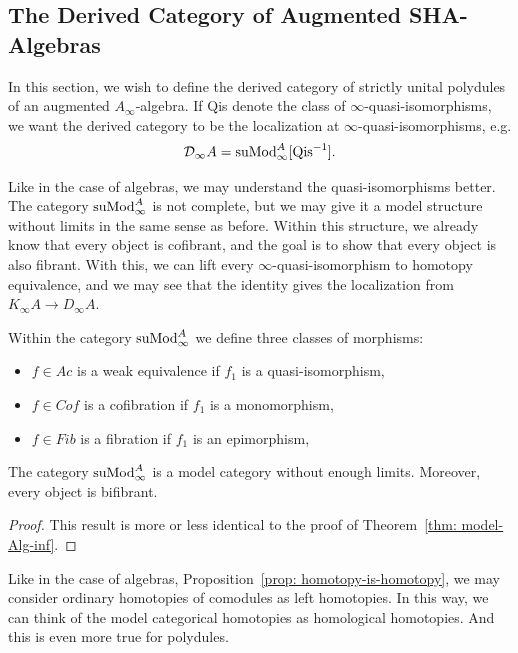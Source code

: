 \documentclass[../thesis.tex]{subfiles}
\begin{document}
        \subsection{The Derived Category of Augmented SHA-Algebras} 

            In this section, we wish to define the derived category of strictly unital polydules of an augmented $A_\infty$-algebra. If Qis denote the class of $\infty$-quasi-isomorphisms, we want the derived category to be the localization at $\infty$-quasi-isomorphisms, e.g.
            \begin{align*}
                \mathcal{D}_\infty A = \tt{suMod}_\infty^A[\tt{Qis}^{-1}].
            \end{align*}

            Like in the case of algebras, we may understand the quasi-isomorphisms better. The category $\tt{suMod}_\infty^A$ is not complete, but we may give it a model structure without limits in the same sense as before. Within this structure, we already know that every object is cofibrant, and the goal is to show that every object is also fibrant. With this, we can lift every $\infty$-quasi-isomorphism to homotopy equivalence, and we may see that the identity gives the localization from $K_\infty A \to D_\infty A$.

            Within the category $\tt{suMod}_\infty^A$ we define three classes of morphisms:
            \begin{itemize}
                \item $f\in Ac$ is a weak equivalence if $f_1$ is a quasi-isomorphism,
                \item $f\in Cof$ is a cofibration if $f_1$ is a monomorphism,
                \item $f\in Fib$ is a fibration if $f_1$ is an epimorphism,
            \end{itemize}

            \begin{thm}
                The category $\tt{suMod}_\infty^A$ is a model category without enough limits. Moreover, every object is bifibrant.
            \end{thm}

            \begin{proof}
                This result is more or less identical to the proof of Theorem~\ref{thm: model-Alg-inf}.
            \end{proof}

            Like in the case of algebras, Proposition~\ref{prop: homotopy-is-homotopy}, we may consider ordinary homotopies of comodules as left homotopies. In this way, we can think of the model categorical homotopies as homological homotopies. And this is even more true for polydules.
\end{document}
